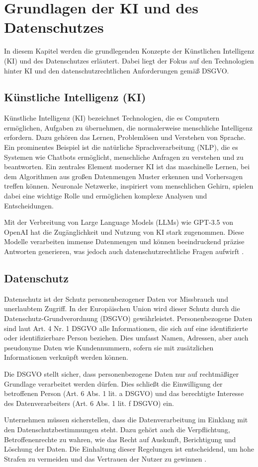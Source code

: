 \chapter{Grundlagen der KI und des Datenschutzes}
In diesem Kapitel werden die grundlegenden Konzepte der Künstlichen Intelligenz
(KI) und des Datenschutzes erläutert. Dabei liegt der Fokus auf den Technologien
hinter KI und den datenschutzrechtlichen Anforderungen gemäß DSGVO.

\section{Künstliche Intelligenz (KI)}
Künstliche Intelligenz (KI) bezeichnet Technologien, die es Computern
ermöglichen, Aufgaben zu übernehmen, die normalerweise menschliche Intelligenz
erfordern. Dazu gehören das Lernen, Problemlösen und Verstehen von Sprache. Ein
prominentes Beispiel ist die natürliche Sprachverarbeitung (NLP), die es
Systemen wie Chatbots ermöglicht, menschliche Anfragen zu verstehen und zu
beantworten. Ein zentrales Element moderner KI ist das maschinelle Lernen, bei
dem Algorithmen aus großen Datenmengen Muster erkennen und Vorhersagen treffen
können. Neuronale Netzwerke, inspiriert vom menschlichen Gehirn, spielen dabei
eine wichtige Rolle und ermöglichen komplexe Analysen und Entscheidungen.

Mit der Verbreitung von Large Language Models (LLMs) wie GPT-3.5 von OpenAI hat
die Zugänglichkeit und Nutzung von KI stark zugenommen. Diese Modelle
verarbeiten immense Datenmengen und können beeindruckend präzise Antworten
generieren, was jedoch auch datenschutzrechtliche Fragen aufwirft \cite{haerting2024}.

\section{Datenschutz}
Datenschutz ist der Schutz personenbezogener Daten vor Missbrauch und
unerlaubtem Zugriff. In der Europäischen Union wird dieser Schutz durch die
Datenschutz-Grundverordnung (DSGVO) gewährleistet. Personenbezogene Daten sind
laut Art. 4 Nr. 1 DSGVO alle Informationen, die sich auf eine identifizierte
oder identifizierbare Person beziehen. Dies umfasst Namen, Adressen, aber auch
pseudonyme Daten wie Kundennummern, sofern sie mit zusätzlichen Informationen
verknüpft werden können.

Die DSGVO stellt sicher, dass personenbezogene Daten nur auf rechtmäßiger
Grundlage verarbeitet werden dürfen. Dies schließt die Einwilligung der
betroffenen Person (Art. 6 Abs. 1 lit. a DSGVO) und das berechtigte Interesse
des Datenverarbeiters (Art. 6 Abs. 1 lit. f DSGVO) ein. 

Unternehmen müssen sicherstellen, dass die Datenverarbeitung im Einklang mit den
Datenschutzbestimmungen steht. Dazu gehört auch die Verpflichtung,
Betroffenenrechte zu wahren, wie das Recht auf Auskunft, Berichtigung und
Löschung der Daten. Die Einhaltung dieser Regelungen ist entscheidend, um hohe
Strafen zu vermeiden und das Vertrauen der Nutzer zu gewinnen \cite{haerting2024}.
